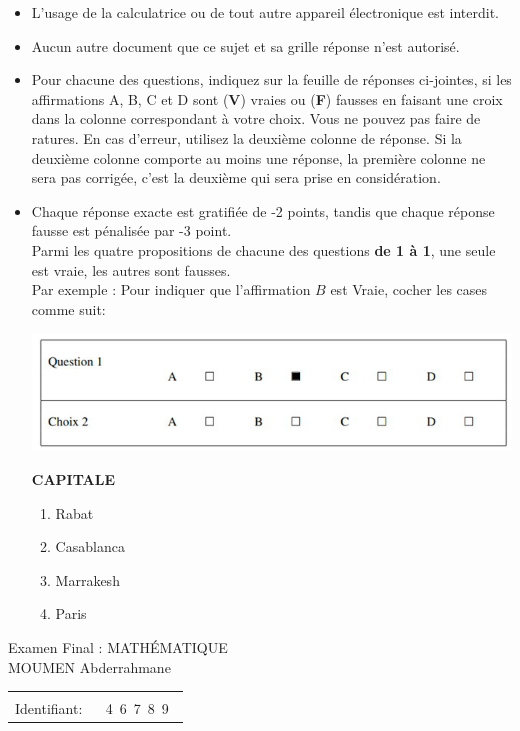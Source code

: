 \documentclass{book}%
\begin{document}
\begin{itemize}%
\item%
L'usage de la calculatrice ou de tout autre appareil électronique est interdit.%
\item%
Aucun autre document que ce sujet et sa grille réponse n'est autorisé.%
\item%
Pour chacune des questions, indiquez sur la feuille de réponses ci-jointes, si les affirmations A, B, C et D sont (\textbf{V}) vraies ou (\textbf{F}) fausses en faisant une croix dans la colonne correspondant à votre choix. Vous ne pouvez pas faire de ratures. En cas d'erreur, utilisez la deuxième colonne de réponse. Si la deuxième colonne comporte au moins une réponse, la première colonne ne sera pas corrigée, c'est la deuxième qui sera prise en considération.%
\item%
Chaque réponse exacte est gratifiée de -2 points, tandis que chaque réponse fausse est pénalisée par -3 point. \\ 	Parmi les quatre propositions de chacune des questions \textbf{de 1 à 1}, une seule est vraie, les autres sont fausses. \\ 	Par exemple : Pour indiquer que l'affirmation $B$ est Vraie, cocher les cases comme suit:  \\ \begin{center}	\includegraphics[scale=0.8]{reponses.png} \end{center}%
\thispagestyle{empty}%
\begin{exercise}%
\textbf{CAPITALE }%
\begin{enumerate}[label=\textbf{\Alph*. }]%
\item%
Rabat%
\item%
Casablanca%
\item%
Marrakesh%
\item%
Paris%
\end{enumerate}%
\end{exercise}%
\end{itemize}%
\newpage%
\thispagestyle{empty}%
Examen Final : MATHÉMATIQUE $\qquad \qquad \qquad \qquad \qquad \qquad \qquad \qquad$ MOUMEN Abderrahmane%
\begin{flushright}%
\begin{tabular}{|l|}%
\hline%
 \\%
\thispagestyle{empty}%
Identifiant: $\quad$ {\Large 4~6~7~8~9~}%
 \\%
\hline%
\end{tabular}%
\end{flushright}%
\end{document}

